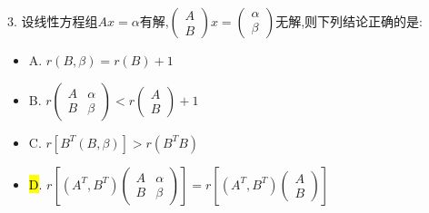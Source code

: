 3. 设线性方程组$Ax=\alpha$有解,$\left( \begin{matrix}
	A\\B
\end{matrix}\right)x=\left( \begin{matrix}
\alpha\\\beta
\end{matrix}\right) $无解,则下列结论正确的是:  
\begin{itemize}
	\item A. $r(B,\beta)=r(B)+1$
	\item B. $r\left(\begin{matrix}
		A&\alpha\\B&\beta
	\end{matrix}\right)<r\left( \begin{matrix}
	A\\B
\end{matrix}\right) +1$
	\item C. $r\left[B^{T}(B,\beta)\right]>r(B^{T}B)$ 
	\item \hl{D}. $r\left[(A^T,B^T)\left(\begin{matrix}
		A&\alpha\\B&\beta
	\end{matrix} \right) \right] =r\left[ (A^T,B^T)\left( \begin{matrix}
	A\\B
\end{matrix}\right) \right] $
\end{itemize}
